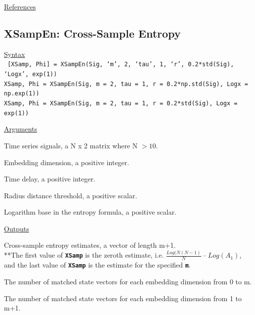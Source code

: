 \documentclass[12pt, a4paper, titlepage, openany]{book}
\begin{document}
\noindent \ul{References}\hspace{1cm}
\cite{Ap1}



\newpage
\subsection{\normalsize XSampEn: \hspace{15mm} Cross-Sample Entropy}
\noindent\ul{Syntax} \vspace{6mm} \\ \noindent \texttt{\footnotesize
[XSamp, Phi] = XSampEn(Sig, ‘m’, 2, ‘tau’, 1, ‘r’, 0.2*std(Sig), ‘Logx’, exp(1))\\
 XSamp, Phi  = XSampEn(Sig, m = 2, tau = 1, r = 0.2*np.std(Sig), Logx = np.exp(1))\\
 XSamp, Phi  = XSampEn(Sig, m = 2, tau = 1, r = 0.2*std(Sig), Logx = exp(1))}

\noindent \ul{Arguments}
\begin{description}[labelsep=1cm, labelwidth=2cm, nosep,,style=multiline,leftmargin=3cm]\footnotesize
\item[\texttt{Sig}]		Time series signals, a N x 2 matrix where N $> 10$.
\item[\texttt{m}]		Embedding dimension, a positive integer.
\item[\texttt{tau}]		Time delay, a positive integer.
\item[\texttt{r}]		Radius distance threshold, a positive scalar.
\item[\texttt{Logx}]	Logarithm base in the entropy formula, a positive scalar.
\end{description}

\noindent \ul{Outputs}
\begin{description}[labelsep=1cm, labelwidth=2cm, nosep, style=multiline,leftmargin=3cm]\footnotesize
\item[\texttt{XSamp}]		Cross-sample entropy estimates, a vector of length m+1.\\
			**The first value of \texttt{\textbf{XSamp}} is the zeroth estimate, i.e.  $\frac{Log(N(N-1)}{N} \ – \ Log(A_1)$,
			and the last value of \texttt{\textbf{XSamp}} is the estimate for the specified \texttt{\textbf{m}}.
\item[\texttt{A}]		The number of matched state vectors for each embedding dimension from 0 to m.
\item[\texttt{B}]		The number of matched state vectors for each embedding dimension from 1 to m+1.
\end{description}
\end{document}
